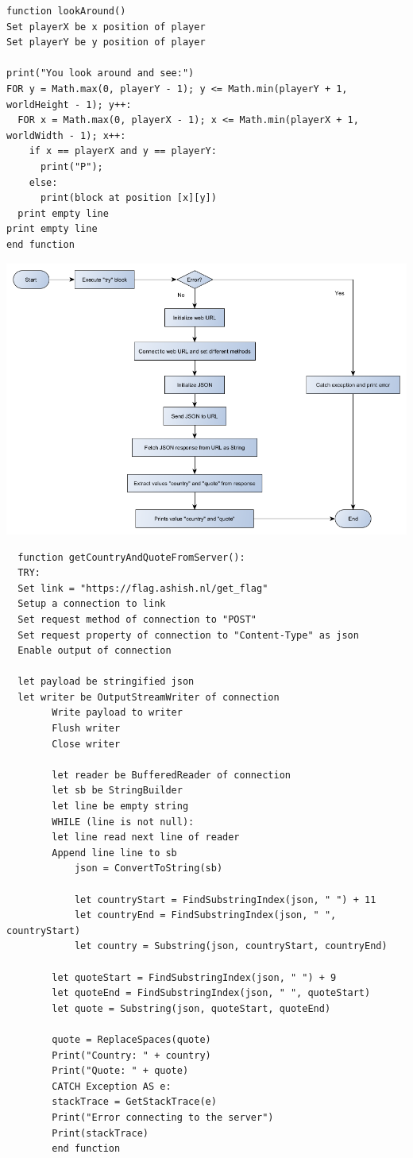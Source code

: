 \begin{lstlisting}
function lookAround()
Set playerX be x position of player
Set playerY be y position of player

print("You look around and see:")
FOR y = Math.max(0, playerY - 1); y <= Math.min(playerY + 1, worldHeight - 1); y++:
  FOR x = Math.max(0, playerX - 1); x <= Math.min(playerX + 1, worldWidth - 1); x++:
    if x == playerX and y == playerY:
      print("P");
    else:
      print(block at position [x][y])
  print empty line
print empty line
end function
\end{lstlisting}
\newpage

{\includegraphics[width=\textwidth]{../flowchart/getCountryAndQuoteFromServer.png}}

\begin{lstlisting}
  function getCountryAndQuoteFromServer():
  TRY:
  Set link = "https://flag.ashish.nl/get_flag"
  Setup a connection to link
  Set request method of connection to "POST"
  Set request property of connection to "Content-Type" as json
  Enable output of connection
  
  let payload be stringified json
  let writer be OutputStreamWriter of connection
        Write payload to writer
        Flush writer
        Close writer
        
        let reader be BufferedReader of connection
        let sb be StringBuilder
        let line be empty string
        WHILE (line is not null):
        let line read next line of reader
        Append line line to sb
            json = ConvertToString(sb)
            
            let countryStart = FindSubstringIndex(json, " ") + 11
            let countryEnd = FindSubstringIndex(json, " ", countryStart)
            let country = Substring(json, countryStart, countryEnd)
            
        let quoteStart = FindSubstringIndex(json, " ") + 9
        let quoteEnd = FindSubstringIndex(json, " ", quoteStart)
        let quote = Substring(json, quoteStart, quoteEnd)
        
        quote = ReplaceSpaces(quote)
        Print("Country: " + country)
        Print("Quote: " + quote)
        CATCH Exception AS e:
        stackTrace = GetStackTrace(e)
        Print("Error connecting to the server")
        Print(stackTrace)
        end function
\end{lstlisting}

